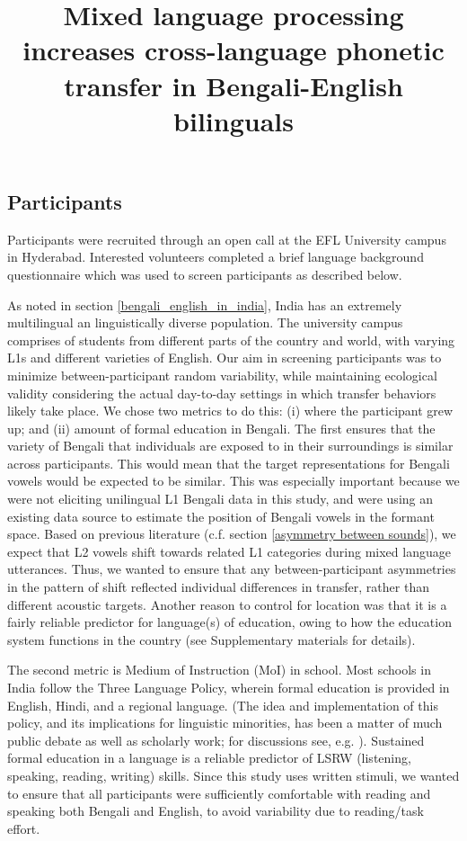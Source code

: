 \documentclass[12 pt]{article}
\title{Mixed language processing increases cross-language phonetic transfer in Bengali-English bilinguals}
\begin{document}
	

\subsection{Participants} \label{participants}
Participants were recruited through an open call at the EFL University campus in Hyderabad. Interested volunteers completed a brief language background questionnaire which was used to screen participants as described below. 

As noted in section \ref{bengali_english_in_india}, India has an extremely multilingual an linguistically diverse population. The university campus comprises of students from different parts of the country and world, with varying L1s and different varieties of English. Our aim in screening participants was to minimize between-participant random variability, while maintaining ecological validity considering the actual day-to-day settings in which transfer behaviors likely take place. We chose two metrics to do this: (i) where the participant grew up; and (ii) amount of formal education in Bengali. The first ensures that the variety of Bengali that individuals are exposed to in their surroundings is similar across participants. This would mean that the target representations for Bengali vowels would be expected to be similar. This was especially important because we were not eliciting unilingual L1 Bengali data in this study, and were using an existing data source to estimate the position of Bengali vowels in the formant space. Based on previous literature (c.f. section \ref{asymmetry between sounds}), we expect that L2 vowels shift towards related L1 categories during mixed language utterances. Thus, we wanted to ensure that any between-participant asymmetries in the pattern of shift reflected individual differences in transfer, rather than different acoustic targets. Another reason to control for location was that it is a fairly reliable predictor for language(s) of education, owing to how the education system functions in the country (see Supplementary materials for details).

The second metric is Medium of Instruction (MoI) in school. Most schools in India follow the Three Language Policy, wherein formal education is provided in English, Hindi, and a regional language. \alert{(The idea and implementation of this policy, and its implications for linguistic minorities, has been a matter of much public debate as well as scholarly work; for discussions see, e.g. \cite{tollefson2014language, jhingran2009hundreds, khubchandani1997language, mohanty2009multilingual, ramanathan2005rethinking}).} Sustained formal education in a language is a reliable predictor of LSRW (listening, speaking, reading, writing) skills. Since this study uses written stimuli, we wanted to ensure that all participants were sufficiently comfortable with reading and speaking both Bengali and English, to avoid variability due to reading/task effort.  
\end{document}

